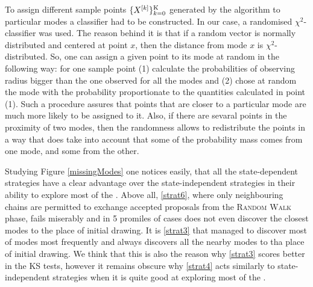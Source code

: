 To assign different sample points $\{ X^{[k]}\}_{k = 0}^{\mathrm{K}}$ generated by the algorithm to particular modes a classifier had to be constructed. In our case, a randomised $\chi^2$-classifier was used. The reason behind it is that if a random vector is normally distributed and centered at point $x$, then the distance from mode $x$ is $\chi^2$-distributed. So, one can assign a given point to its mode at random in the following way: for one sample point (1) calculate the probabilities of observing radius bigger than the one observed for all the modes and (2) chose at random the mode with the probability proportionate to the quantities calculated in point (1). Such a procedure assures that points that are closer to a particular mode are much more likely to be assigned to it. Also, if there are sevaral points in the proximity of two modes, then the randomness allows to redistribute the points in a way that does take into account that some of the probability mass comes from one mode, and some from the other.   

Studying Figure \ref{missingModes} one notices easily, that all the state-dependent strategies have a clear advantage over the state-independent strategies in their ability to explore most of the \sspace. Above all, \ref{strat6}, where only neighbouring chains are permitted to exchange accepted proposals from the \textsc{Random Walk} phase, fails miserably and in 5 promiles of cases does not even  discover the closest modes to the place of initial drawing. It is \ref{strat3} that managed to discover most of modes most frequently and always discovers all the nearby modes to tha place of initial drawing. We think that this is also the reason why \ref{strat3} scores better in the KS tests, however it remains obscure why \ref{strat4} acts similarly to state-independent strategies when it is quite good at exploring most of the \sspace. 


